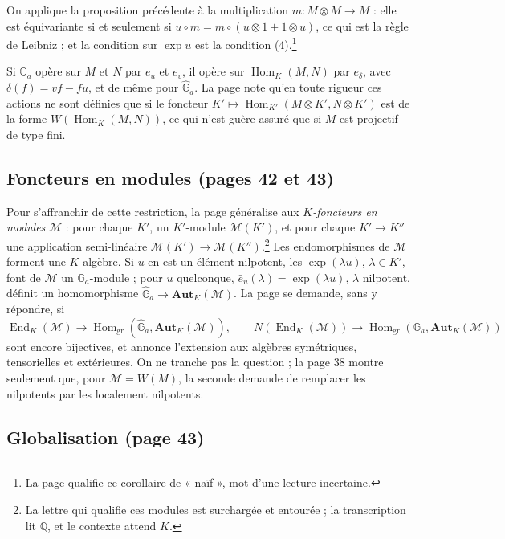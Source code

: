 \documentclass[11pt,a4paper]{article}
\begin{document}
On applique la proposition précédente à la multiplication
$m : M \otimes M \to M$ : elle est équivariante si et seulement si
$u \circ m = m \circ (u \otimes 1 + 1 \otimes u)$, ce qui est la règle de
Leibniz ; et la condition sur $\exp u$ est la condition (4).\footnote{La page
qualifie ce corollaire de « naïf », mot d'une lecture incertaine.}

Si $\mathbb{G}_a$ opère sur $M$ et $N$ par $e_u$ et $e_v$, il opère sur
$\operatorname{Hom}_K(M, N)$ par $e_\delta$, avec $\delta(f) = vf - fu$, et de
même pour $\widehat{\mathbb{G}}_a$. La page note qu'en toute rigueur ces
actions ne sont définies que si le foncteur
$K' \mapsto \operatorname{Hom}_{K'}(M \otimes K', N \otimes K')$ est de la
forme $W(\operatorname{Hom}_K(M, N))$, ce qui n'est guère assuré que si $M$
est projectif de type fini.

\subsection*{Foncteurs en modules (pages 42 et 43)}

Pour s'affranchir de cette restriction, la page généralise aux
\emph{$K$-foncteurs en modules} $\mathcal{M}$ : pour chaque $K'$, un
$K'$-module $\mathcal{M}(K')$, et pour chaque $K' \to K''$ une application
semi-linéaire $\mathcal{M}(K') \to \mathcal{M}(K'')$.\footnote{La lettre qui
qualifie ces modules est surchargée et entourée ; la transcription lit
$\mathbb{Q}$, et le contexte attend $K$.} Les endomorphismes de
$\mathcal{M}$ forment une $K$-algèbre. Si $u$ en est un élément nilpotent,
les $\exp(\lambda u)$, $\lambda \in K'$, font de $\mathcal{M}$ un
$\mathbb{G}_a$-module ; pour $u$ quelconque,
$\bar e_u(\lambda) = \exp(\lambda u)$, $\lambda$ nilpotent, définit un
homomorphisme $\widehat{\mathbb{G}}_a \to \mathbf{Aut}_K(\mathcal{M})$. La
page se demande, sans y répondre, si
\[
\operatorname{End}_K(\mathcal{M}) \to
\operatorname{Hom}_{\mathrm{gr}}(\widehat{\mathbb{G}}_a, \mathbf{Aut}_K(\mathcal{M})),
\qquad
N(\operatorname{End}_K(\mathcal{M})) \to
\operatorname{Hom}_{\mathrm{gr}}(\mathbb{G}_a, \mathbf{Aut}_K(\mathcal{M}))
\]
sont encore bijectives, et annonce l'extension aux algèbres symétriques,
tensorielles et extérieures. On ne tranche pas la question ; la page 38 montre
seulement que, pour $\mathcal{M} = W(M)$, la seconde demande de remplacer les
nilpotents par les localement nilpotents.

\subsection*{Globalisation (page 43)}
\end{document}
